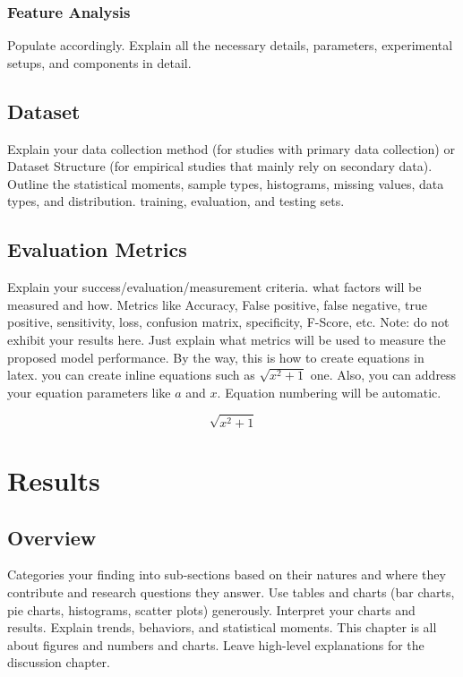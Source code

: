 \documentclass[12pt, twoside]{report}
\begin{document}
\subsection{Feature Analysis} 
Populate accordingly. Explain all the necessary details, parameters, experimental setups, and components in detail.  

\section{Dataset}
Explain your data collection method (for studies with primary data collection) or Dataset Structure (for empirical studies that mainly rely on secondary data). Outline the statistical moments, sample types, histograms, missing values, data types, and distribution. training, evaluation, and testing sets.
\section{Evaluation Metrics}
Explain your success/evaluation/measurement criteria. what factors will be measured and how.  Metrics like Accuracy, False positive, false negative, true positive, sensitivity, loss, confusion matrix, specificity, F-Score, etc.  Note: do not exhibit your results here. Just explain what metrics will be used to measure the proposed model performance. By the way, this is how to create equations in latex. you can create inline equations such as \(\sqrt{x^2+1}\) one. Also, you can address your equation parameters like $a$ and $x$. Equation numbering will be automatic. 


\begin{equation}
\sqrt{x^2+1}
\end{equation}


\chapter{Results} 
\thispagestyle{empty}
\section{Overview}
Categories your finding into sub-sections based on their natures and where they contribute and research questions they answer. Use tables and charts (bar charts, pie charts, histograms, scatter plots) generously. Interpret your charts and results. Explain trends, behaviors, and statistical moments. This chapter is all about figures and numbers and charts. Leave high-level explanations for the discussion chapter.  
\end{document}
